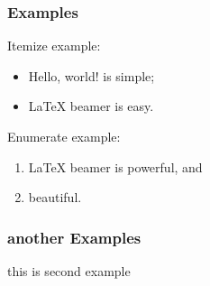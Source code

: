 \documentclass{beamer}
\begin{document}
 \begin{frame}\frametitle{Examples}
   Itemize example: \pause
   \begin{itemize}
   \item Hello, world! is simple;  \pause
   \item \LaTeX{} beamer is easy. \pause
   \end{itemize}
   Enumerate example: \pause
   \begin{enumerate}
   \item \LaTeX{} beamer is powerful, and \pause
   \item beautiful. \pause
   \end{enumerate}
 \end{frame}
 \begin{frame}\frametitle{another Examples}
   this is second example
 \end{frame}
\end{document}
